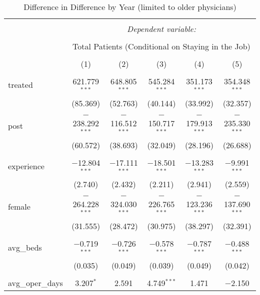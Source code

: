 
\begin{table}[!htbp] \centering 
  \caption{Difference in Difference by Year (limited to older physicians)} 
  \label{} 
\scriptsize 
\begin{tabular}{@{\extracolsep{0pt}}lccccc} 
\\[-1.8ex]\hline 
\hline \\[-1.8ex] 
 & \multicolumn{5}{c}{\textit{Dependent variable:}} \\ 
\cline{2-6} 
\\[-1.8ex] & \multicolumn{5}{c}{Total Patients (Conditional on Staying in the Job)} \\ 
\\[-1.8ex] & (1) & (2) & (3) & (4) & (5)\\ 
\hline \\[-1.8ex] 
 treated & 621.779$^{***}$ & 648.805$^{***}$ & 545.284$^{***}$ & 351.173$^{***}$ & 354.348$^{***}$ \\ 
  & (85.369) & (52.763) & (40.144) & (33.992) & (32.357) \\ 
  & & & & & \\ 
 post & $-$238.292$^{***}$ & $-$116.512$^{***}$ & $-$150.717$^{***}$ & $-$179.913$^{***}$ & $-$235.330$^{***}$ \\ 
  & (60.572) & (38.693) & (32.049) & (28.196) & (26.688) \\ 
  & & & & & \\ 
 experience & $-$12.804$^{***}$ & $-$17.111$^{***}$ & $-$18.501$^{***}$ & $-$13.283$^{***}$ & $-$9.991$^{***}$ \\ 
  & (2.740) & (2.432) & (2.211) & (2.941) & (2.559) \\ 
  & & & & & \\ 
 female & $-$264.228$^{***}$ & $-$324.030$^{***}$ & $-$226.765$^{***}$ & $-$123.236$^{***}$ & $-$137.690$^{***}$ \\ 
  & (31.555) & (28.472) & (30.975) & (38.297) & (32.391) \\ 
  & & & & & \\ 
 avg\_beds & $-$0.719$^{***}$ & $-$0.726$^{***}$ & $-$0.578$^{***}$ & $-$0.787$^{***}$ & $-$0.488$^{***}$ \\ 
  & (0.035) & (0.049) & (0.039) & (0.049) & (0.042) \\ 
  & & & & & \\ 
 avg\_oper\_days & 3.207$^{*}$ & 2.591 & 4.749$^{***}$ & 1.471 & $-$2.150 \\ 

\end{tabular}
\end{table}
